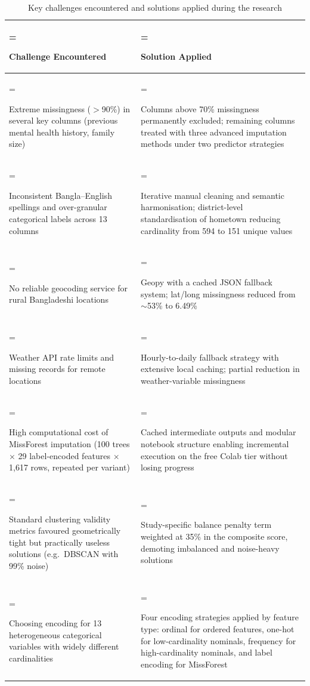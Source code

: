 \begin{table}[H]
\centering
\caption[Key challenges and solutions]{Key challenges encountered and solutions applied during the research}
\label{tbl:key_challenges_encountered_and}
\renewcommand{\arraystretch}{1.0}
\small
\begin{tabularx}{\textwidth}{|>{\hsize=0.889\hsize\linewidth=\hsize\raggedright\arraybackslash}X|>{\hsize=1.111\hsize\linewidth=\hsize\raggedright\arraybackslash}X|}
\hline
\textbf{Challenge Encountered} & \textbf{Solution Applied} \\ \hline
Extreme missingness ($>$90\%) in several key columns (previous mental health history, family size) & Columns above 70\% missingness permanently excluded; remaining columns treated with three advanced imputation methods under two predictor strategies \\ \hline
Inconsistent Bangla--English spellings and over-granular categorical labels across 13 columns & Iterative manual cleaning and semantic harmonisation; district-level standardisation of hometown reducing cardinality from 594 to 151 unique values \\ \hline
No reliable geocoding service for rural Bangladeshi locations & Geopy with a cached JSON fallback system; lat/long missingness reduced from $\sim$53\% to 6.49\% \\ \hline
Weather API rate limits and missing records for remote locations & Hourly-to-daily fallback strategy with extensive local caching; partial reduction in weather-variable missingness \\ \hline
High computational cost of MissForest imputation (100 trees $\times$ 29 label-encoded features $\times$ 1{,}617 rows, repeated per variant) & Cached intermediate outputs and modular notebook structure enabling incremental execution on the free Colab tier without losing progress \\ \hline
Standard clustering validity metrics favoured geometrically tight but practically useless solutions (e.g.\ DBSCAN with 99\% noise) & Study-specific balance penalty term weighted at 35\% in the composite score, demoting imbalanced and noise-heavy solutions \\ \hline
Choosing encoding for 13 heterogeneous categorical variables with widely different cardinalities & Four encoding strategies applied by feature type: ordinal for ordered features, one-hot for low-cardinality nominals, frequency for high-cardinality nominals, and label encoding for MissForest \\ \hline
\end{tabularx}
\end{table}


